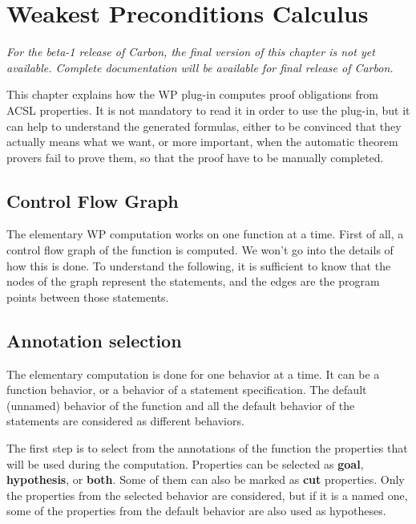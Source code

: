 \chapter{Weakest Preconditions Calculus}
\label{wp-calculus}

\begin{center}
\color{orange}\it For the beta-1 release of Carbon, the final version of this
chapter is not yet available. Complete documentation will be available
for final release of Carbon.
\end{center}

This chapter explains how the WP plug-in computes proof obligations
from ACSL properties.
It is not mandatory to read it in order to use the plug-in,
but it can help to understand the generated formulas, either to be convinced
that they actually means what we want, or more important, 
when the automatic theorem provers fail to
prove them, so that the proof have to be manually completed.

\section{Control Flow Graph}

The elementary WP computation works on one function at a time.
First of all, a control flow graph of the function is computed.
We won't go into the details of how this is done. 
To understand the following, it is sufficient to know that
the nodes of the graph represent the statements, and the edges
are the program points between those statements.

\section{Annotation selection}

The elementary computation is done for one behavior at a time.
It can be a function behavior, or a behavior of a statement specification.
The default (unnamed) behavior of the function and all the default behavior of
the statements are considered as different behaviors.

The first step is to select from the annotations of the function
the properties that will be used during the computation.
Properties can be selected as {\bf goal}, {\bf hypothesis}, or {\bf both}.
Some of them can also be marked as {\bf cut} properties.
Only the properties from the selected behavior are considered,
but if it is a named one, 
some of the properties from the default behavior are also used as hypotheses.

